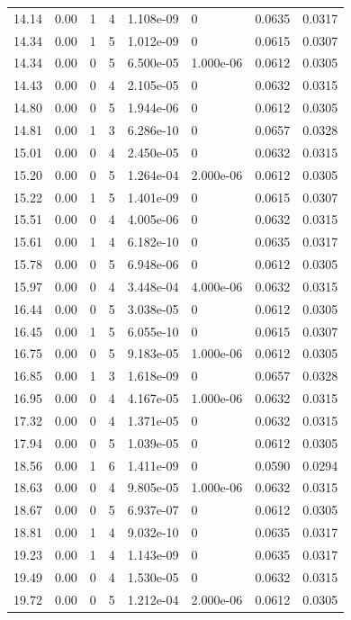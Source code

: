 \documentclass[preview]{standalone}
\begin{document}
{{{\begin{tabular}{L{1.2cm}C{1.2cm} C{0.3cm}C{0.5cm} C{1.4cm}C{1.4cm} C{1.4cm}C{1.4cm}}
  14.14  &  0.00  & 1     &  4 &  1.108e-09  & 0  & 0.0635 &  0.0317   \\ 
  14.34  &  0.00  & 1     &  5 &  1.012e-09  & 0  & 0.0615 &  0.0307   \\ 
  14.34  &  0.00  & 0     &  5 &  6.500e-05  & 1.000e-06  & 0.0612 &  0.0305   \\ 
  14.43  &  0.00  & 0     &  4 &  2.105e-05  & 0  & 0.0632 &  0.0315   \\ 
  14.80  &  0.00  & 0     &  5 &  1.944e-06  & 0  & 0.0612 &  0.0305   \\ 
  14.81  &  0.00  & 1     &  3 &  6.286e-10  & 0  & 0.0657 &  0.0328   \\ 
  15.01  &  0.00  & 0     &  4 &  2.450e-05  & 0  & 0.0632 &  0.0315   \\ 
  15.20  &  0.00  & 0     &  5 &  1.264e-04  & 2.000e-06  & 0.0612 &  0.0305   \\ 
  15.22  &  0.00  & 1     &  5 &  1.401e-09  & 0  & 0.0615 &  0.0307   \\ 
  15.51  &  0.00  & 0     &  4 &  4.005e-06  & 0  & 0.0632 &  0.0315   \\ 
  15.61  &  0.00  & 1     &  4 &  6.182e-10  & 0  & 0.0635 &  0.0317   \\ 
  15.78  &  0.00  & 0     &  5 &  6.948e-06  & 0  & 0.0612 &  0.0305   \\ 
  15.97  &  0.00  & 0     &  4 &  3.448e-04  & 4.000e-06  & 0.0632 &  0.0315   \\ 
  16.44  &  0.00  & 0     &  5 &  3.038e-05  & 0  & 0.0612 &  0.0305   \\ 
  16.45  &  0.00  & 1     &  5 &  6.055e-10  & 0  & 0.0615 &  0.0307   \\ 
  16.75  &  0.00  & 0     &  5 &  9.183e-05  & 1.000e-06  & 0.0612 &  0.0305   \\ 
  16.85  &  0.00  & 1     &  3 &  1.618e-09  & 0  & 0.0657 &  0.0328   \\ 
  16.95  &  0.00  & 0     &  4 &  4.167e-05  & 1.000e-06  & 0.0632 &  0.0315   \\ 
  17.32  &  0.00  & 0     &  4 &  1.371e-05  & 0  & 0.0632 &  0.0315   \\ 
  17.94  &  0.00  & 0     &  5 &  1.039e-05  & 0  & 0.0612 &  0.0305   \\ 
  18.56  &  0.00  & 1     &  6 &  1.411e-09  & 0  & 0.0590 &  0.0294   \\ 
  18.63  &  0.00  & 0     &  4 &  9.805e-05  & 1.000e-06  & 0.0632 &  0.0315   \\ 
  18.67  &  0.00  & 0     &  5 &  6.937e-07  & 0  & 0.0612 &  0.0305   \\ 
  18.81  &  0.00  & 1     &  4 &  9.032e-10  & 0  & 0.0635 &  0.0317   \\ 
  19.23  &  0.00  & 1     &  4 &  1.143e-09  & 0  & 0.0635 &  0.0317   \\ 
  19.49  &  0.00  & 0     &  4 &  1.530e-05  & 0  & 0.0632 &  0.0315   \\ 
  19.72  &  0.00  & 0     &  5 &  1.212e-04  & 2.000e-06  & 0.0612 &  0.0305   \\ 
\hline 
\end{tabular} 

}}}
\end{document}
